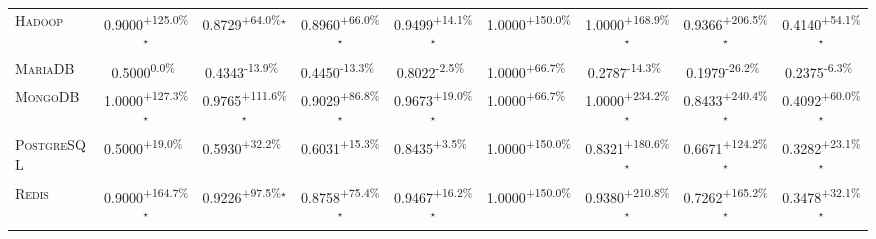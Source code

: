 \begin{table}[htbp]
\begin{tabular}{l|cccc|cccc}
\textsc{Hadoop} & \cellcolor{green!30}0.9000\textsuperscript{+125.0\%}$^\star$ & \cellcolor{green!30}0.8729\textsuperscript{+64.0\%}$^\star$ & \cellcolor{green!30}0.8960\textsuperscript{+66.0\%}$^\star$ & \cellcolor{green!30}0.9499\textsuperscript{+14.1\%}$^\star$ & \cellcolor{green!30}1.0000\textsuperscript{+150.0\%}$^{\,\,\,}$ & \cellcolor{green!30}1.0000\textsuperscript{+168.9\%}$^\star$ & \cellcolor{green!30}0.9366\textsuperscript{+206.5\%}$^\star$ & \cellcolor{green!30}0.4140\textsuperscript{+54.1\%}$^\star$ \\
\textsc{MariaDB} & \cellcolor{red!30}0.5000\textsuperscript{0.0\%}$^{\,\,\,}$ & \cellcolor{red!30}0.4343\textsuperscript{-13.9\%}$^{\,\,\,}$ & \cellcolor{red!30}0.4450\textsuperscript{-13.3\%}$^{\,\,\,}$ & \cellcolor{red!30}0.8022\textsuperscript{-2.5\%}$^{\,\,\,}$ & \cellcolor{green!30}1.0000\textsuperscript{+66.7\%}$^{\,\,\,}$ & \cellcolor{red!30}0.2787\textsuperscript{-14.3\%}$^{\,\,\,}$ & \cellcolor{red!30}0.1979\textsuperscript{-26.2\%}$^{\,\,\,}$ & \cellcolor{red!30}0.2375\textsuperscript{-6.3\%}$^{\,\,\,}$ \\
\textsc{MongoDB} & \cellcolor{green!30}1.0000\textsuperscript{+127.3\%}$^\star$ & \cellcolor{green!30}0.9765\textsuperscript{+111.6\%}$^\star$ & \cellcolor{green!30}0.9029\textsuperscript{+86.8\%}$^\star$ & \cellcolor{green!30}0.9673\textsuperscript{+19.0\%}$^\star$ & \cellcolor{green!30}1.0000\textsuperscript{+66.7\%}$^{\,\,\,}$ & \cellcolor{green!30}1.0000\textsuperscript{+234.2\%}$^\star$ & \cellcolor{green!30}0.8433\textsuperscript{+240.4\%}$^\star$ & \cellcolor{green!30}0.4092\textsuperscript{+60.0\%}$^\star$ \\
\textsc{PostgreSQL} & \cellcolor{green!30}0.5000\textsuperscript{+19.0\%}$^{\,\,\,}$ & \cellcolor{green!30}0.5930\textsuperscript{+32.2\%}$^{\,\,\,}$ & \cellcolor{green!30}0.6031\textsuperscript{+15.3\%}$^{\,\,\,}$ & \cellcolor{green!30}0.8435\textsuperscript{+3.5\%}$^{\,\,\,}$ & \cellcolor{green!30}1.0000\textsuperscript{+150.0\%}$^{\,\,\,}$ & \cellcolor{green!30}0.8321\textsuperscript{+180.6\%}$^\star$ & \cellcolor{green!30}0.6671\textsuperscript{+124.2\%}$^\star$ & \cellcolor{green!30}0.3282\textsuperscript{+23.1\%}$^\star$ \\
\textsc{Redis} & \cellcolor{green!30}0.9000\textsuperscript{+164.7\%}$^\star$ & \cellcolor{green!30}0.9226\textsuperscript{+97.5\%}$^\star$ & \cellcolor{green!30}0.8758\textsuperscript{+75.4\%}$^\star$ & \cellcolor{green!30}0.9467\textsuperscript{+16.2\%}$^\star$ & \cellcolor{green!30}1.0000\textsuperscript{+150.0\%}$^{\,\,\,}$ & \cellcolor{green!30}0.9380\textsuperscript{+210.8\%}$^\star$ & \cellcolor{green!30}0.7262\textsuperscript{+165.2\%}$^\star$ & \cellcolor{green!30}0.3478\textsuperscript{+32.1\%}$^\star$ \\

\end{tabular}
\end{table}

